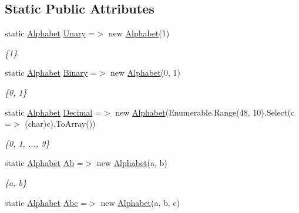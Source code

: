 \subsection*{Static Public Attributes}
\begin{DoxyCompactItemize}
\item 
static \mbox{\hyperlink{class_system_1_1_automata_1_1_alphabet}{Alphabet}} \mbox{\hyperlink{class_system_1_1_automata_1_1_alphabet_afa68a933ddc9aaa35cbeb8aa42ece58c}{Unary}} =$>$ new \mbox{\hyperlink{class_system_1_1_automata_1_1_alphabet}{Alphabet}}(\textquotesingle{}1\textquotesingle{})
\begin{DoxyCompactList}\small\item\em \{1\} \end{DoxyCompactList}\item 
static \mbox{\hyperlink{class_system_1_1_automata_1_1_alphabet}{Alphabet}} \mbox{\hyperlink{class_system_1_1_automata_1_1_alphabet_a33781b08f0b9a39f1da39ee85fd69fb3}{Binary}} =$>$ new \mbox{\hyperlink{class_system_1_1_automata_1_1_alphabet}{Alphabet}}(\textquotesingle{}0\textquotesingle{}, \textquotesingle{}1\textquotesingle{})
\begin{DoxyCompactList}\small\item\em \{0, 1\} \end{DoxyCompactList}\item 
static \mbox{\hyperlink{class_system_1_1_automata_1_1_alphabet}{Alphabet}} \mbox{\hyperlink{class_system_1_1_automata_1_1_alphabet_a815270890b0afe881cfa7af15b4a4895}{Decimal}} =$>$ new \mbox{\hyperlink{class_system_1_1_automata_1_1_alphabet}{Alphabet}}(Enumerable.\+Range(48, 10).Select(c =$>$ (char)c).To\+Array())
\begin{DoxyCompactList}\small\item\em \{0, 1, ..., 9\} \end{DoxyCompactList}\item 
static \mbox{\hyperlink{class_system_1_1_automata_1_1_alphabet}{Alphabet}} \mbox{\hyperlink{class_system_1_1_automata_1_1_alphabet_a5040c44fbca9ecf1348714c74b848b1d}{Ab}} =$>$ new \mbox{\hyperlink{class_system_1_1_automata_1_1_alphabet}{Alphabet}}(\textquotesingle{}a\textquotesingle{}, \textquotesingle{}b\textquotesingle{})
\begin{DoxyCompactList}\small\item\em \{a, b\} \end{DoxyCompactList}\item 
static \mbox{\hyperlink{class_system_1_1_automata_1_1_alphabet}{Alphabet}} \mbox{\hyperlink{class_system_1_1_automata_1_1_alphabet_a2c79b315618446cdd7ba875a7924d83f}{Abc}} =$>$ new \mbox{\hyperlink{class_system_1_1_automata_1_1_alphabet}{Alphabet}}(\textquotesingle{}a\textquotesingle{}, \textquotesingle{}b\textquotesingle{}, \textquotesingle{}c\textquotesingle{})

\end{DoxyCompactItemize}
